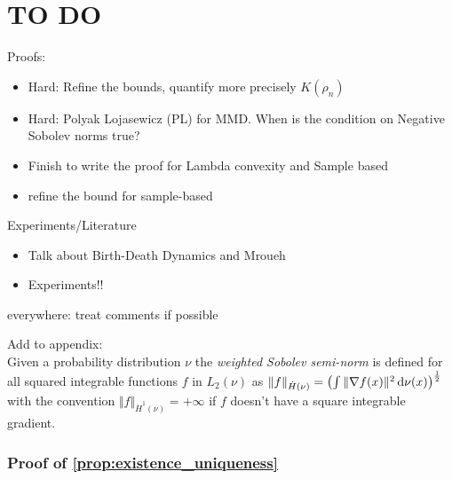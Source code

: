 
\section*{TO DO}

Proofs:
\begin{itemize}
	\item Hard: Refine the bounds, quantify more precisely $K(\rho_n)$
	\item Hard: Polyak Lojasewicz (PL) for MMD. When is the condition on Negative Sobolev norms true?
	\item Finish to write the proof for Lambda convexity and Sample based
	\item refine the bound for sample-based
\end{itemize}


Experiments/Literature
\begin{itemize}
	\item Talk about Birth-Death Dynamics and Mroueh
	\item Experiments!!
\end{itemize}
everywhere: treat comments if possible

Add to appendix:\\

Given a probability distribution $\nu$ the \textit{weighted Sobolev semi-norm} is defined for all squared integrable functions $f$ in $L_2(\nu)$ as $ \Vert f \Vert_{\dot{H}(\nu)} = \left(\int \Vert \nabla f(x) \Vert^2 \mathop{}\!\mathrm{d} \nu(x) \right)^{\frac{1}{2}}$ with the convention $\Vert f \Vert_{\dot{H}^1(\nu)} = +\infty$ if $f$ doesn't have a square integrable gradient.

\subsubsection{Proof of \cref{prop:existence_uniqueness}}

